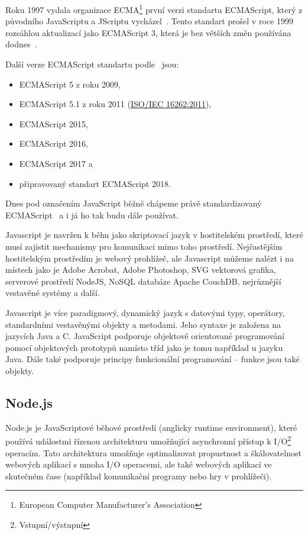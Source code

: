 Roku 1997 vydala organizace ECMA\footnote{European Computer Manufacturer's Association} první verzi standartu ECMAScript, který z původního JavaScriptu a JScriptu vycházel~\cite{ecma:ecmascript1}.
Tento standart prošel v roce 1999 rozsáhlou aktualizací jako ECMAScript 3, která je bez větších změn používána dodnes~\cite{mozzila:javascript}.

Další verze ECMAScript standartu podle~\cite{mozzila:javascriptVerisions} jsou:
\begin{itemize}
    \item ECMAScript 5 z roku 2009,
    \item ECMAScript 5.1 z roku 2011 (\href{http://www.iso.org/iso/iso_catalogue/catalogue_tc/catalogue_detail.htm?csnumber=55755}{ISO/IEC 16262:2011}),
    \item ECMAScript 2015,
    \item ECMAScript 2016,
    \item ECMAScript 2017 a
    \item připravovaný standart ECMAScript 2018.
\end{itemize}

Dnes pod označením JavaScript běžně chápeme právě standardizovaný ECMAScript~\cite{mozzila:javascript} a i já ho tak budu dále používat.

Javascript je navržen k běhu jako skriptovací jazyk v hostitelském prostředí, které musí zajistit mechanismy pro komunikaci mimo toho prostředí.
Nejčastějším hostitelským prostředím je webový prohlížeč, ale Javascript můžeme nalézt i na místech jako je Adobe Acrobat, Adobe Photoshop, SVG vektorová grafika, serverové prostředí NodeJS, NoSQL databáze Apache CouchDB, nejrůznější vestavěné systémy a další.~\cite{mozzila:javascript}

Javascript je více paradigmový, dynamický jazyk s datovými typy, operátory, standardními vestavěnými objekty a metodami.
Jeho syntaxe je založena na jazycích Java a C.
JavaScript podporuje objektově orientované programování pomocí objektových prototypů namísto tříd jako je tomu například u jazyku Java.
Dále také podporuje principy funkcionální programování -- funkce jsou také objekty.~\cite{mozzila:javascript}

\subsection{Node.js}\label{subsec:nodejs}

Node.js je JavaScriptové běhové prostředí (anglicky runtime environment), které používá událostmi řízenou architekturu umožňující asynchronní přístup k I/O\footnote{Vstupní/výstupní} operacím.
Tato architektura umožňuje optimalizovat propustnost a škálovatelnost webových aplikací s mnoha I/O operacemi, ale také webových aplikací ve skutečném čase (například komunikační programy nebo hry v prohlížeči).~\cite{node:article2013}

